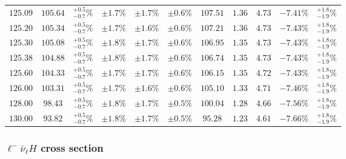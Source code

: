 \begin{table}[ht!]
{{\begin{tabular}{| cc | c | ccc | cccc | c |}
$125.09$ & $105.64$ & $^{+0.5}_{-0.7}\%$ & $\pm 1.7\%$ & {\color{black!55}$\pm 1.7\%$} & {\color{black!55}$\pm 0.6\%$} & $107.51$ & $1.36$ & $4.73$ & $-7.41\%$ & $^{+1.8}_{-1.9}\%$ \\
$125.20$ & $105.34$ & $^{+0.5}_{-0.7}\%$ & $\pm 1.7\%$ & {\color{black!55}$\pm 1.6\%$} & {\color{black!55}$\pm 0.6\%$} & $107.21$ & $1.36$ & $4.73$ & $-7.43\%$ & $^{+1.8}_{-1.9}\%$ \\
$125.30$ & $105.08$ & $^{+0.5}_{-0.7}\%$ & $\pm 1.8\%$ & {\color{black!55}$\pm 1.7\%$} & {\color{black!55}$\pm 0.6\%$} & $106.95$ & $1.35$ & $4.73$ & $-7.43\%$ & $^{+1.8}_{-1.9}\%$ \\
$125.38$ & $104.88$ & $^{+0.5}_{-0.7}\%$ & $\pm 1.8\%$ & {\color{black!55}$\pm 1.7\%$} & {\color{black!55}$\pm 0.6\%$} & $106.74$ & $1.35$ & $4.73$ & $-7.43\%$ & $^{+1.8}_{-1.9}\%$ \\
$125.60$ & $104.33$ & $^{+0.5}_{-0.7}\%$ & $\pm 1.7\%$ & {\color{black!55}$\pm 1.7\%$} & {\color{black!55}$\pm 0.6\%$} & $106.15$ & $1.35$ & $4.72$ & $-7.43\%$ & $^{+1.8}_{-1.9}\%$ \\
$126.00$ & $103.31$ & $^{+0.5}_{-0.7}\%$ & $\pm 1.7\%$ & {\color{black!55}$\pm 1.6\%$} & {\color{black!55}$\pm 0.6\%$} & $105.10$ & $1.33$ & $4.71$ & $-7.46\%$ & $^{+1.8}_{-1.9}\%$ \\
$128.00$ & $98.43$ & $^{+0.5}_{-0.7}\%$ & $\pm 1.8\%$ & {\color{black!55}$\pm 1.7\%$} & {\color{black!55}$\pm 0.5\%$} & $100.04$ & $1.28$ & $4.66$ & $-7.56\%$ & $^{+1.8}_{-1.9}\%$ \\
$130.00$ & $93.82$ & $^{+0.5}_{-0.7}\%$ & $\pm 1.8\%$ & {\color{black!55}$\pm 1.7\%$} & {\color{black!55}$\pm 0.5\%$} & $95.28$ & $1.23$ & $4.61$ & $-7.66\%$ & $^{+1.8}_{-1.9}\%$ \\
\cline{1-11}
\end{tabular}
}
}
\end{table}







\FloatBarrier
\subsubsection{\texorpdfstring{$\ell^- \bar{\nu}_{\ell} H$}{l- nul-bar H} cross section}

